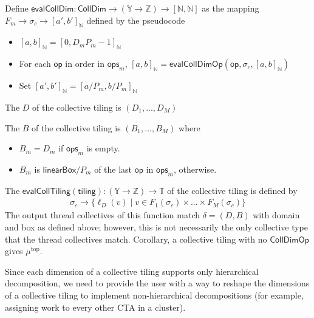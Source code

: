 \filbreak
Define $\mathsf{evalCollDim}: \mathsf{CollDim} \to (\mathbb{Y} \to \mathbb{Z}) \to [\mathbb{N}, \mathbb{N}]$
as the mapping $F_m \to \sigma_c \to [a', b']_\mathbb{N}$ defined by the pseudocode
\begin{itemize}
  \item $[a, b]_\mathbb{N} = [0, D_mP_m-1]_\mathbb{N}$
  \item For each $\mathsf{op}$ in order in $\mathsf{ops}_m$, $[a, b]_\mathbb{N} = \mathsf{evalCollDimOp}(\mathsf{op}, \sigma_c, [a, b]_\mathbb{N})$
  \item Set $[a', b']_\mathbb{N} = [a / P_m, b / P_m]_\mathbb{N}$
\end{itemize}

\filbreak
The  $D$ of the collective tiling is $(D_1, ..., D_M)$

\filbreak
The  $B$ of the collective tiling is $(B_1, ..., B_M)$ where
\begin{itemize}
  \item $B_m = D_m$ if $\mathsf{ops}_m$ is empty.
  \item $B_m$ is $\mathsf{linearBox} / P_m$ of the last $\mathsf{op}$ in $\mathsf{ops}_m$, otherwise.
\end{itemize}

\filbreak
The  $\mathsf{evalCollTiling(tiling)}: (\mathbb{Y} \to \mathbb{Z}) \to \mathbb{T}$ of the collective tiling is defined by
\begin{gather*}
  \sigma_c \to \{ \ell_D(v) \mid v \in F_1(\sigma_c) \times ... \times F_M(\sigma_c) \}
\end{gather*}
\filbreak
The output thread collectives of this function match $\delta = (D, B)$ with domain and box as defined above; however, this is not necessarily the only collective type that the thread collectives match.
Corollary, a collective tiling with no $\mathsf{CollDimOp}$ gives $\mu^\text{top}$.

\filbreak
{}


Since each dimension of a collective tiling supports only hierarchical decomposition, we need to provide the user with a way to reshape the dimensions of a collective tiling to implement non-hierarchical decompositions
(for example, assigning work to every other CTA in a cluster).

